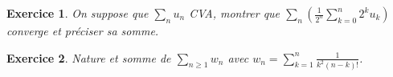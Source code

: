 \documentclass[12pt,a4paper]{article}
\newcommand{\R}{\mathbb{R}}
\newcommand{\N}{\mathbb{N}}
\theoremstyle{break}
\newtheorem{Exo}{Exercice}
\begin{document}
\begin{Exo}
	On suppose que $\displaystyle\sum_nu_n$ CVA, montrer que $\displaystyle\sum_n \left(\frac{1}{2^n}\sum_{k=0}^{n}2^k u_k\right)$ converge et préciser sa somme.
\end{Exo}

\begin{Exo}
	Nature et somme de $\sum_{n\geqslant 1}w_n$ avec $w_n=\sum_{k=1}^{n}\frac{1}{k^2(n-k)!}$.
\end{Exo}

%
%
\end{document}
